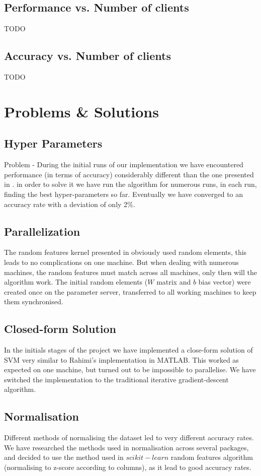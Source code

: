 \documentclass[12pt,a4paper]{article}
\begin{document}
\subsection{Performance vs. Number of clients}
TODO

\subsection{Accuracy vs. Number of clients}
TODO

\section{Problems \& Solutions}
\subsection{Hyper Parameters}
Problem - During the initial runs of our implementation we have encountered performance (in terms of accuracy) considerably different than the one presented in \cite{Rahimi07randomfeatures}. in order to solve it we have run the algorithm for numerous runs, in each run, finding the best hyper-parameters so far. Eventually we have converged to an accuracy rate with a deviation of only 2\%.

\subsection{Parallelization}
The random features kernel presented in \cite{Rahimi07randomfeatures} obviously used random elements, this leads to no complications on one machine. But when dealing with numerous machines, the random features must match across all machines, only then will the algorithm work.
The initial random elements ($W$ matrix and $b$ bias vector) were created once on the parameter server, transferred to all working machines to keep them synchronised.

\subsection{Closed-form Solution}
In the initials stages of the project we have implemented a close-form solution of SVM very similar to Rahimi's implementation in MATLAB. This worked as expected on one machine, but turned out to be impossible to parallelise.
We have switched the implementation to the traditional iterative gradient-descent algorithm.

\subsection{Normalisation}
Different methods of normalising the dataset led to very different accuracy rates.
We have researched the methods used in normalisation across several packages, and decided to use the method used in $scikit-learn$ random features algorithm (normalising to z-score according to columns), as it lead to good accuracy rates.
\end{document}
